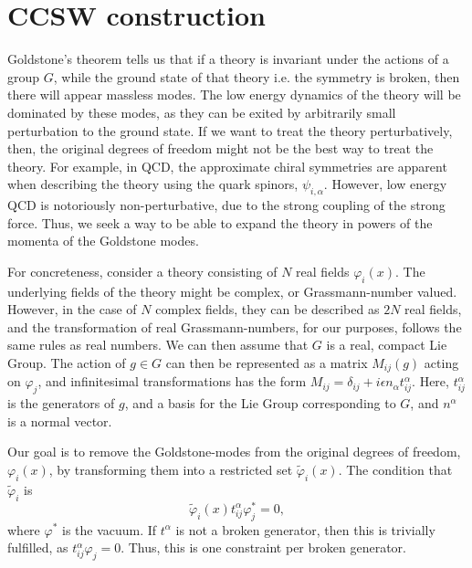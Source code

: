 \section{CCSW construction}

Goldstone's theorem tells us that if a theory is invariant under the actions of a group $G$, while the ground state of that theory i.e. the symmetry is broken, then there will appear massless modes.
The low energy dynamics of the theory will be dominated by these modes, as they can be exited by arbitrarily small perturbation to the ground state.
If we want to treat the theory perturbatively, then, the original degrees of freedom might not be the best way to treat the theory.
For example, in QCD, the approximate chiral symmetries are apparent when describing the theory using the quark spinors, $\psi_{i, \alpha}$.
However, low energy QCD is notoriously non-perturbative, due to the strong coupling of the strong force.
Thus, we seek a way to be able to expand the theory in powers of the momenta of the Goldstone modes.

For concreteness, consider a theory consisting of $N$ real fields $\varphi_i(x)$.
The underlying fields of the theory might be complex, or Grassmann-number valued.
However, in the case of $N$ complex fields, they can be described as $2N$ real fields, and the transformation of real Grassmann-numbers, for our purposes, follows the same rules as real numbers.
We can then assume that $G$ is a real, compact Lie Group. 
The action of $g\in G$ can then be represented as a matrix $M_{ij}(g)$ acting on $\varphi_j$, and infinitesimal transformations has the form $M_{ij} = \delta_{ij} + i \epsilon n_{\alpha} t^\alpha_{ij}$.
Here, $t_{ij}^\alpha$ is the generators of $g$, and a basis for the Lie Group corresponding to $G$, and $n^{\alpha}$ is a normal vector.

Our goal is to remove the Goldstone-modes from the original degrees of freedom, $\varphi_i(x)$, by transforming them into a restricted set $\tilde \varphi_i(x)$.
The condition that $\tilde \varphi_i$ is 
\begin{equation}
    \tilde \varphi_i(x) t^\alpha_{ij} \varphi^*_{j} = 0,
\end{equation}
where $\varphi^*$ is the vacuum.
If $t^\alpha$ is not a broken generator, then this is trivially fulfilled, as $t^\alpha _{ij}\varphi_{j} = 0$.
Thus, this is one constraint per broken generator. 

